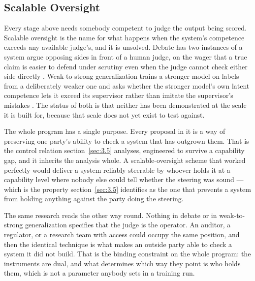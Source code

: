 \subsection{Scalable Oversight}
\label{sec:4.2.6}
Every stage above needs somebody competent to judge the output being scored. Scalable oversight is the name for what happens when the system's competence exceeds any available judge's, and it is unsolved. Debate has two instances of a system argue opposing sides in front of a human judge, on the wager that a true claim is easier to defend under scrutiny even when the judge cannot check either side directly \autocite{irving2018ai}. Weak-to-strong generalization trains a stronger model on labels from a deliberately weaker one and asks whether the stronger model's own latent competence lets it exceed its supervisor rather than imitate the supervisor's mistakes \autocite{burns2023weaktostrong}. The status of both is that neither has been demonstrated at the scale it is built for, because that scale does not yet exist to test against.

The whole program has a single purpose. Every proposal in it is a way of preserving one party's ability to check a system that has outgrown them. That is the control relation section~\ref{sec:3.5} analyses, engineered to survive a capability gap, and it inherits the analysis whole. A scalable-oversight scheme that worked perfectly would deliver a system reliably steerable by whoever holds it at a capability level where nobody else could tell whether the steering was sound — which is the property section~\ref{sec:3.5} identifies as the one that prevents a system from holding anything against the party doing the steering.

The same research reads the other way round. Nothing in debate or in weak-to-strong generalization specifies that the judge is the operator. An auditor, a regulator, or a research team with access could occupy the same position, and then the identical technique is what makes an outside party able to check a system it did not build. That is the binding constraint on the whole program: the instruments are dual, and what determines which way they point is who holds them, which is not a parameter anybody sets in a training run.
